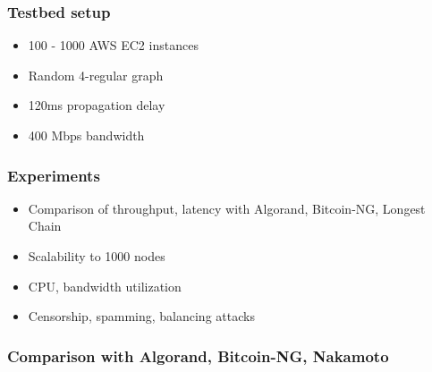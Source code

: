 \documentclass[aspectratio=169]{beamer}
\begin{document}
\begin{frame}
    \frametitle{Testbed setup}
    \begin{itemize}
        \item 100 - 1000 AWS EC2 instances
        \item Random 4-regular graph
        \item 120ms propagation delay
        \item 400 Mbps bandwidth
    \end{itemize}
\end{frame}

\begin{frame}
    \frametitle{Experiments}
        \begin{itemize}
            \item \alert<2>{Comparison of throughput, latency with Algorand, Bitcoin-NG, Longest Chain}
            \item Scalability to 1000 nodes
            \item \alert<2>{CPU, bandwidth utilization}
            \item Censorship, spamming, balancing attacks
        \end{itemize}
\end{frame}

\begin{frame}
    \frametitle{Comparison with Algorand, Bitcoin-NG, Nakamoto}
\end{frame}
\end{document}
